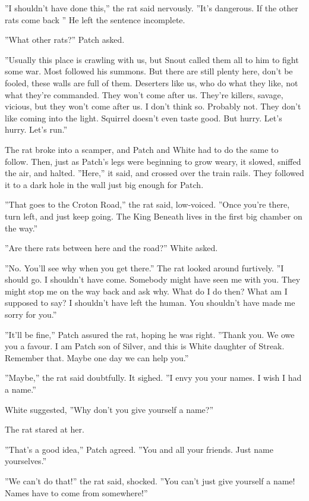 \documentclass[12pt]{book}
\begin{document}
''I shouldn't have done this,'' the rat said nervously. ''It's dangerous. If the other rats come back %
'' He left the sentence incomplete.

''What other rats?'' Patch asked.

''Usually this place is crawling with us, but Snout called them all to him to fight some war. Most followed his summons. But there are still plenty here, don't be fooled, these walls are full of them. Deserters like us, who do what they like, not what they're commanded. They won't come after us. They're killers, savage, vicious, but they won't come after us. I don't think so. Probably not. They don't like coming into the light. Squirrel doesn't even taste good. But hurry. Let's hurry. Let's run.''

The rat broke into a scamper, and Patch and White had to do the same to follow. Then, just as Patch's legs were beginning to grow weary, it slowed, sniffed the air, and halted. ''Here,'' it said, and crossed over the train rails. They followed it to a dark hole in the wall just big enough for Patch.

''That goes to the Croton Road,'' the rat said, low-voiced. ''Once you're there, turn left, and just keep going. The King Beneath lives in the first big chamber on the way.''

''Are there rats between here and the road?'' White asked.

''No. You'll see why when you get there.'' The rat looked around furtively. ''I should go. I shouldn't have come. Somebody might have seen me with you. They might stop me on the way back and ask why. What do I do then? What am I supposed to say? I shouldn't have left the human. You shouldn't have made me sorry for you.''

''It'll be fine,'' Patch assured the rat, hoping he was right. ''Thank you. We owe you a favour. I am Patch son of Silver, and this is White daughter of Streak. Remember that. Maybe one day we can help you.''

''Maybe,'' the rat said doubtfully. It sighed. ''I envy you your names. I wish I had a name.''

White suggested, ''Why don't you give yourself a name?''

The rat stared at her.

''That's a good idea,'' Patch agreed. ''You and all your friends. Just name yourselves.''

''We can't do that!'' the rat said, shocked. ''You can't just give yourself a name! Names have to come from somewhere!''
\end{document}
